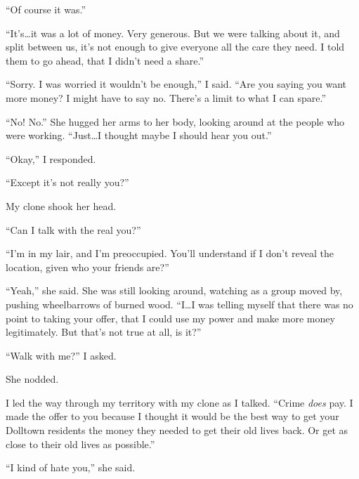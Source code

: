``Of course it was.''



``It's\ldots it was a lot of money.  Very generous.  But we were talking about it, and split between us, it's not enough to give everyone all the care they need.  I told them to go ahead, that I didn't need a share.''



``Sorry.  I was worried it wouldn't be enough,'' I said.  ``Are you saying you want more money?  I might have to say no.  There's a limit to what I can spare.''



``No!  No.''  She hugged her arms to her body, looking around at the people who were working.  ``Just\ldots I thought maybe I should hear you out.''



``Okay,'' I responded.



``Except it's not really you?''



My clone shook her head.



``Can I talk with the real you?''



``I'm in my lair, and I'm preoccupied.  You'll understand if I don't reveal the location, given who your friends are?''



``Yeah,'' she said.  She was still looking around, watching as a group moved by, pushing wheelbarrows of burned wood.  ``I\ldots I was telling myself that there was no point to taking your offer, that I could use my power and make more money legitimately.  But that's not true at all, is it?''



``Walk with me?'' I asked.



She nodded.



I led the way through my territory with my clone as I talked.  ``Crime \emph{does} pay.  I made the offer to you because I thought it would be the best way to get your Dolltown residents the money they needed to get their old lives back.  Or get as close to their old lives as possible.''



``I kind of hate you,'' she said.




